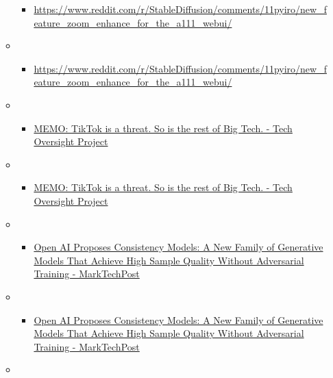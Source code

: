 \begin{itemize}
\begin{itemize}
\begin{itemize}
    \item
      \url{https://www.reddit.com/r/StableDiffusion/comments/11pyiro/new_feature_zoom_enhance_for_the_a111_webui/}
    \end{itemize}
  \item
    \begin{itemize}
     
    \item
      \url{https://www.reddit.com/r/StableDiffusion/comments/11pyiro/new_feature_zoom_enhance_for_the_a111_webui/}
    \end{itemize}
  \item
    \begin{itemize}
     
    \item
      \href{https://techoversight.org/2023/03/20/memo-tiktok-is-a-threat-so-is-the-rest-of-big-tech/}{MEMO:
      TikTok is a threat. So is the rest of Big Tech. - Tech Oversight
      Project}
    \end{itemize}
  \item
    \begin{itemize}
     
    \item
      \href{https://techoversight.org/2023/03/20/memo-tiktok-is-a-threat-so-is-the-rest-of-big-tech/}{MEMO:
      TikTok is a threat. So is the rest of Big Tech. - Tech Oversight
      Project}
    \end{itemize}
  \item
    \begin{itemize}
     
    \item
      \href{https://www.marktechpost.com/2023/03/10/open-ai-proposes-consistency-models-a-new-family-of-generative-models-that-achieve-high-sample-quality-without-adversarial-training/}{Open
      AI Proposes Consistency Models: A New Family of Generative Models
      That Achieve High Sample Quality Without Adversarial Training -
      MarkTechPost}
    \end{itemize}
  \item
    \begin{itemize}
     
    \item
      \href{https://www.marktechpost.com/2023/03/10/open-ai-proposes-consistency-models-a-new-family-of-generative-models-that-achieve-high-sample-quality-without-adversarial-training/}{Open
      AI Proposes Consistency Models: A New Family of Generative Models
      That Achieve High Sample Quality Without Adversarial Training -
      MarkTechPost}
    \end{itemize}
  \item
    \begin{itemize}
     

\end{itemize}
\end{itemize}
\end{itemize}
